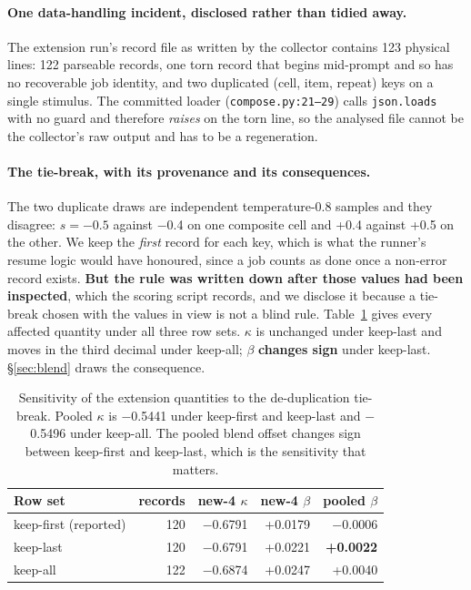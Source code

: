 \documentclass{article}
\providecommand{\textminus}{\ensuremath{-}}
\begin{document}
\paragraph{One data-handling incident, disclosed rather than tidied away.} The
  extension run's record file as written by the collector contains 123 physical
  lines: 122 parseable records, one torn record that begins mid-prompt and so
  has no recoverable job identity, and two duplicated
  (cell, item, repeat) keys on a single stimulus. The committed loader
  (\texttt{compose.py:21--29}) calls \texttt{json.loads} with no guard and
  therefore \emph{raises} on the torn line, so the analysed file cannot be the
  collector's raw output and has to be a regeneration.

\paragraph{The tie-break, with its provenance and its consequences.} The two
  duplicate draws are independent temperature-0.8 samples and they disagree:
  $s = -0.5$ against \textminus 0.4 on one composite cell and +0.4 against +0.5 on
  the other. We keep the \emph{first} record for each key, which is what the
  runner's resume logic would have honoured, since a job counts as done once a
  non-error record exists. \textbf{But the rule was written down after those
  values had been inspected}, which the scoring script records, and we disclose
  it because a tie-break chosen with the values in view is not a blind rule.
  Table~\ref{tab:rowsets} gives every affected quantity under all three row
  sets. $\kappa$ is unchanged under keep-last and moves in the third decimal
  under keep-all; $\beta$ \textbf{changes sign} under keep-last. \S\ref{sec:blend} draws the consequence.

\begin{table}[htbp]
  \centering
  \small
  \begin{tabular}{lrrrr}
    \toprule
    Row set & records & new-4 $\kappa$ & new-4 $\beta$ & pooled $\beta$ \\
    \midrule
    keep-first (reported) & 120 & \textminus 0.6791 & +0.0179 & \textminus 0.0006 \\
    keep-last & 120 & \textminus 0.6791 & +0.0221 & \textbf{+0.0022} \\
    keep-all & 122 & \textminus 0.6874 & +0.0247 & +0.0040 \\
    \bottomrule
  \end{tabular}
  \caption{Sensitivity of the extension quantities to the de-duplication
  tie-break. Pooled $\kappa$ is \textminus 0.5441 under keep-first and keep-last and
  \textminus 0.5496 under keep-all. The pooled blend offset changes sign between
  keep-first and keep-last, which is the sensitivity that matters.}
  \label{tab:rowsets}
\end{table}
\end{document}
